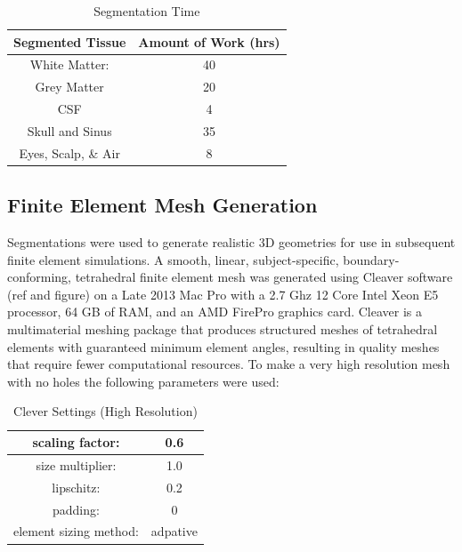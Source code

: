 \begin{table}[H]
\centering
\caption{Segmentation Time}
\label{tab:seg}
\begin{tabular}{|c|c|}
\hline
Segmented Tissue    & Amount of Work (hrs) \\ \hline
White Matter:       & 40                   \\ \hline
Grey Matter         & 20                   \\ \hline
CSF                 & 4                    \\ \hline
Skull and Sinus     & 35                   \\ \hline
Eyes, Scalp, \& Air & 8                    \\ \hline
\end{tabular}
\end{table}

\subsection{Finite Element Mesh Generation}
\label{sec:mesh}


Segmentations were used to generate realistic 3D geometries for use in subsequent finite element simulations. A smooth, linear, subject-specific, boundary-conforming, tetrahedral finite element mesh was generated using Cleaver software (ref and figure) on a Late 2013 Mac Pro with a 2.7 Ghz 12 Core Intel Xeon E5 processor, 64 GB of RAM, and an AMD FirePro graphics card. Cleaver is a multimaterial meshing package that produces structured meshes of tetrahedral elements with guaranteed minimum element angles, resulting in quality meshes that require fewer computational resources. To make a very high resolution mesh with no holes the following parameters were used: 
\begin{table}[H]
\centering
\caption{Clever Settings (High Resolution)}
\label{my-label}
\begin{tabular}{|c|c|}
\hline
scaling factor:                    & 0.6                 \\ \hline
size multiplier:                   & 1.0                 \\ \hline
lipschitz:                         & 0.2                 \\ \hline
padding:                           & 0                   \\ \hline
element sizing method:             & adpative            \\ \hline
\end{tabular}
\end{table}

